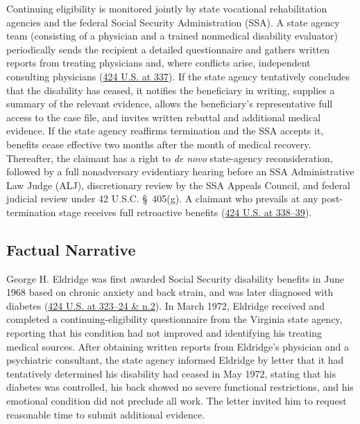 \documentclass[12pt]{article}
\begin{document}
Continuing eligibility is monitored jointly by state vocational rehabilitation agencies and the federal Social Security Administration (SSA). A state agency team (consisting of a physician and a trained nonmedical disability evaluator) periodically sends the recipient a detailed questionnaire and gathers written reports from treating physicians and, where conflicts arise, independent consulting physicians (\href{https://supreme.justia.com/cases/federal/us/424/319/}{424 U.S. at 337}). If the state agency tentatively concludes that the disability has ceased, it notifies the beneficiary in writing, supplies a summary of the relevant evidence, allows the beneficiary's representative full access to the case file, and invites written rebuttal and additional medical evidence. If the state agency reaffirms termination and the SSA accepts it, benefits cease effective two months after the month of medical recovery. Thereafter, the claimant has a right to \emph{de novo} state-agency reconsideration, followed by a full nonadversary evidentiary hearing before an SSA Administrative Law Judge (ALJ), discretionary review by the SSA Appeals Council, and federal judicial review under 42 U.S.C. \S~405(g). A claimant who prevails at any post-termination stage receives full retroactive benefits (\href{https://supreme.justia.com/cases/federal/us/424/319/}{424 U.S. at 338--39}).

\subsection{Factual Narrative}
George H. Eldridge was first awarded Social Security disability benefits in June 1968 based on chronic anxiety and back strain, and was later diagnosed with diabetes (\href{https://supreme.justia.com/cases/federal/us/424/319/}{424 U.S. at 323--24 \& n.2}). In March 1972, Eldridge received and completed a continuing-eligibility questionnaire from the Virginia state agency, reporting that his condition had not improved and identifying his treating medical sources. After obtaining written reports from Eldridge's physician and a psychiatric consultant, the state agency informed Eldridge by letter that it had tentatively determined his disability had ceased in May 1972, stating that his diabetes was controlled, his back showed no severe functional restrictions, and his emotional condition did not preclude all work. The letter invited him to request reasonable time to submit additional evidence.
\end{document}
